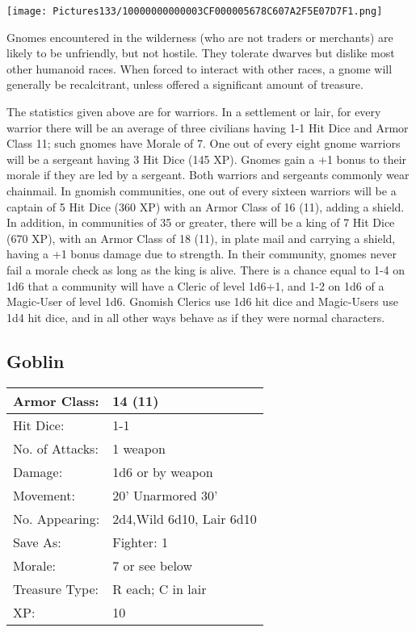 \documentclass[a4paper,twoside,openany,10pt]{book}
\begin{document}
\begin{multicols}{2}
\begin{center}
	\texttt{[image: Pictures133/10000000000003CF000005678C607A2F5E07D7F1.png]}
\end{center}

Gnomes encountered in the wilderness (who are not traders or merchants) are likely to be unfriendly, but not hostile. They tolerate dwarves but dislike most other humanoid races. When forced to interact with other races, a gnome will generally be recalcitrant, unless offered a significant amount of treasure.

The statistics given above are for warriors. In a settlement or lair, for every warrior there will be an average of three civilians having 1-1 Hit Dice and Armor Class 11; such gnomes have Morale of 7. One out of every eight gnome warriors will be a sergeant having 3 Hit Dice (145 XP). Gnomes gain a +1 bonus to their morale if they are led by a sergeant. Both warriors and sergeants commonly wear chainmail. In gnomish communities, one out of every sixteen warriors will be a captain of 5 Hit Dice (360 XP) with an Armor Class of 16 (11), adding a shield. In addition, in communities of 35 or greater, there will be a king of 7 Hit Dice (670 XP), with an Armor Class of 18 (11), in plate mail and carrying a shield, having a +1 bonus damage due to strength. In their community, gnomes never fail a morale check as long as the king is alive. There is a chance equal to 1-4 on 1d6 that a community will have a Cleric of level 1d6+1, and 1-2 on 1d6 of a Magic-User of level 1d6. Gnomish Clerics use 1d6 hit dice and Magic-Users use 1d4 hit dice, and in all other ways behave as if they were normal characters.

\subsection*{Goblin}\label{goblin}

\begin{tabularx}{0.48\textwidth}{@{}lX@{}}
Armor Class: & 14 (11) \\\hline
Hit Dice: & 1-1 \\\hline
No. of Attacks: & 1 weapon \\\hline
Damage: & 1d6 or by weapon \\\hline
Movement: & 20' Unarmored 30' \\\hline
No. Appearing: & 2d4,Wild 6d10, Lair 6d10 \\\hline
Save As: & Fighter: 1 \\\hline
Morale: & 7 or see below \\\hline
Treasure Type: & R each; C in lair \\\hline
XP: & 10 \\\hline
\end{tabularx}\medskip



\end{multicols}
\end{document}
